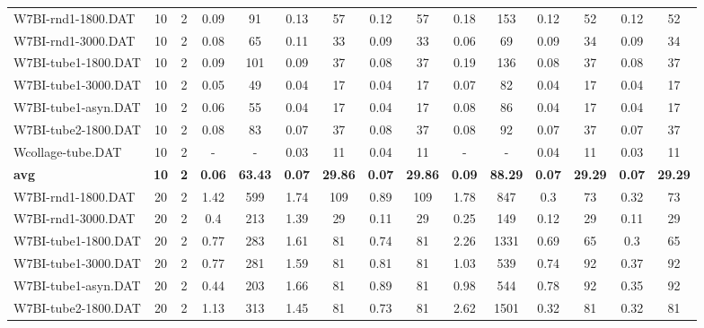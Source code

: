 \begin{table}[!ht]
{\begin{tabular}{lcccccccccccccc}
W7BI-rnd1-1800.DAT & 10 & 2 &  \textcolor{blue2}{0.09} & 91 & 0.13 & 57 & 0.12 & 57 & 0.18 & 153 & 0.12 & 52 & 0.12 & 52 \\
W7BI-rnd1-3000.DAT & 10 & 2 & 0.08 & 65 & 0.11 & 33 & 0.09 & 33 &  \textcolor{blue2}{0.06} & 69 & 0.09 & 34 & 0.09 & 34 \\
W7BI-tube1-1800.DAT & 10 & 2 & 0.09 & 101 & 0.09 & 37 &  \textcolor{blue2}{0.08} & 37 & 0.19 & 136 &  \textcolor{blue2}{0.08} & 37 &  \textcolor{blue2}{0.08} & 37 \\
W7BI-tube1-3000.DAT & 10 & 2 & 0.05 & 49 &  \textcolor{blue2}{0.04} & 17 &  \textcolor{blue2}{0.04} & 17 & 0.07 & 82 &  \textcolor{blue2}{0.04} & 17 &  \textcolor{blue2}{0.04} & 17 \\
W7BI-tube1-asyn.DAT & 10 & 2 & 0.06 & 55 &  \textcolor{blue2}{0.04} & 17 &  \textcolor{blue2}{0.04} & 17 & 0.08 & 86 &  \textcolor{blue2}{0.04} & 17 &  \textcolor{blue2}{0.04} & 17 \\
W7BI-tube2-1800.DAT & 10 & 2 & 0.08 & 83 &  \textcolor{blue2}{0.07} & 37 & 0.08 & 37 & 0.08 & 92 &  \textcolor{blue2}{0.07} & 37 &  \textcolor{blue2}{0.07} & 37 \\
Wcollage-tube.DAT & 10 & 2 &  - &  - &  \textcolor{blue2}{0.03} & 11 & 0.04 & 11 &  - &  - & 0.04 & 11 &  \textcolor{blue2}{0.03} & 11 \\
\cline{1-15} \textbf{avg} & \textbf{10} & \textbf{2} & \textbf{0.06} & \textbf{63.43} & \textbf{0.07} & \textbf{29.86} & \textbf{0.07} & \textbf{29.86} & \textbf{0.09} & \textbf{88.29} & \textbf{0.07} & \textbf{29.29} & \textbf{0.07} & \textbf{29.29} \\ \cline{1-15}
W7BI-rnd1-1800.DAT & 20 & 2 & 1.42 & 599 & 1.74 & 109 & 0.89 & 109 & 1.78 & 847 &  \textcolor{blue2}{0.3} & 73 & 0.32 & 73 \\
W7BI-rnd1-3000.DAT & 20 & 2 & 0.4 & 213 & 1.39 & 29 &  \textcolor{blue2}{0.11} & 29 & 0.25 & 149 & 0.12 & 29 &  \textcolor{blue2}{0.11} & 29 \\
W7BI-tube1-1800.DAT & 20 & 2 & 0.77 & 283 & 1.61 & 81 & 0.74 & 81 & 2.26 & 1331 & 0.69 & 65 &  \textcolor{blue2}{0.3} & 65 \\
W7BI-tube1-3000.DAT & 20 & 2 & 0.77 & 281 & 1.59 & 81 & 0.81 & 81 & 1.03 & 539 & 0.74 & 92 &  \textcolor{blue2}{0.37} & 92 \\
W7BI-tube1-asyn.DAT & 20 & 2 & 0.44 & 203 & 1.66 & 81 & 0.89 & 81 & 0.98 & 544 & 0.78 & 92 &  \textcolor{blue2}{0.35} & 92 \\
W7BI-tube2-1800.DAT & 20 & 2 & 1.13 & 313 & 1.45 & 81 & 0.73 & 81 & 2.62 & 1501 &  \textcolor{blue2}{0.32} & 81 &  \textcolor{blue2}{0.32} & 81 \\

\end{tabular}}
\end{table}
